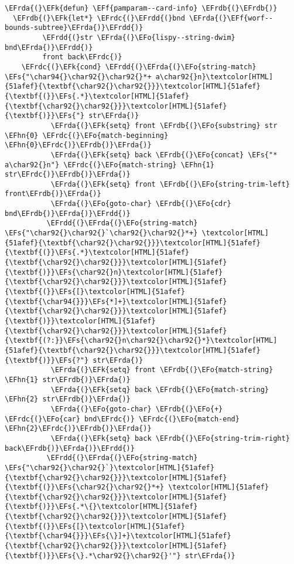 \documentclass[a4wide,10pt]{article}
\newcommand{\EFs}[1]{\textcolor{EFs}{#1}} %
\newcommand{\EFk}[1]{\textcolor{EFk}{#1}} %
\newcommand{\EFf}[1]{\textcolor{EFf}{#1}} %
\newcommand{\EFo}[1]{\textcolor{EFo}{#1}} %
\newcommand{\EFhn}[1]{\textcolor{EFhn}{\textbf{#1}}} %
\newcommand{\EFrda}[1]{\textcolor{EFrda}{#1}} %
\newcommand{\EFrdb}[1]{\textcolor{EFrdb}{#1}} %
\newcommand{\EFrdc}[1]{\textcolor{EFrdc}{#1}} %
\newcommand{\EFrdd}[1]{\textcolor{EFrdd}{#1}} %
\begin{document}
\begin{Code}
\begin{Verbatim}
\EFrda{(}\EFk{defun} \EFf{pamparam--card-info} \EFrdb{(}\EFrdb{)}
  \EFrdb{(}\EFk{let*} \EFrdc{(}\EFrdd{(}bnd \EFrda{(}\EFf{worf--bounds-subtree}\EFrda{)}\EFrdd{)}
         \EFrdd{(}str \EFrda{(}\EFo{lispy--string-dwim} bnd\EFrda{)}\EFrdd{)}
         front back\EFrdc{)}
    \EFrdc{(}\EFk{cond} \EFrdd{(}\EFrda{(}\EFo{string-match} \EFs{"\char94{}\char92{}\char92{}*+ a\char92{}n}\textcolor[HTML]{51afef}{\textbf{\char92{}\char92{}}}\textcolor[HTML]{51afef}{\textbf{(}}\EFs{.*}\textcolor[HTML]{51afef}{\textbf{\char92{}\char92{}}}\textcolor[HTML]{51afef}{\textbf{)}}\EFs{"} str\EFrda{)}
           \EFrda{(}\EFk{setq} front \EFrdb{(}\EFo{substring} str \EFhn{0} \EFrdc{(}\EFo{match-beginning} \EFhn{0}\EFrdc{)}\EFrdb{)}\EFrda{)}
           \EFrda{(}\EFk{setq} back \EFrdb{(}\EFo{concat} \EFs{"* a\char92{}n"} \EFrdc{(}\EFo{match-string} \EFhn{1} str\EFrdc{)}\EFrdb{)}\EFrda{)}
           \EFrda{(}\EFk{setq} front \EFrdb{(}\EFo{string-trim-left} front\EFrdb{)}\EFrda{)}
           \EFrda{(}\EFo{goto-char} \EFrdb{(}\EFo{cdr} bnd\EFrdb{)}\EFrda{)}\EFrdd{)}
          \EFrdd{(}\EFrda{(}\EFo{string-match} \EFs{"\char92{}\char92{}`\char92{}\char92{}*+} \textcolor[HTML]{51afef}{\textbf{\char92{}\char92{}}}\textcolor[HTML]{51afef}{\textbf{(}}\EFs{.*}\textcolor[HTML]{51afef}{\textbf{\char92{}\char92{}}}\textcolor[HTML]{51afef}{\textbf{)}}\EFs{\char92{}n}\textcolor[HTML]{51afef}{\textbf{\char92{}\char92{}}}\textcolor[HTML]{51afef}{\textbf{(}}\EFs{[}\textcolor[HTML]{51afef}{\textbf{\char94{}}}\EFs{*]+}\textcolor[HTML]{51afef}{\textbf{\char92{}\char92{}}}\textcolor[HTML]{51afef}{\textbf{)}}\textcolor[HTML]{51afef}{\textbf{\char92{}\char92{}}}\textcolor[HTML]{51afef}{\textbf{(?:}}\EFs{\char92{}n\char92{}\char92{}*}\textcolor[HTML]{51afef}{\textbf{\char92{}\char92{}}}\textcolor[HTML]{51afef}{\textbf{)}}\EFs{?"} str\EFrda{)}
           \EFrda{(}\EFk{setq} front \EFrdb{(}\EFo{match-string} \EFhn{1} str\EFrdb{)}\EFrda{)}
           \EFrda{(}\EFk{setq} back \EFrdb{(}\EFo{match-string} \EFhn{2} str\EFrdb{)}\EFrda{)}
           \EFrda{(}\EFo{goto-char} \EFrdb{(}\EFo{+} \EFrdc{(}\EFo{car} bnd\EFrdc{)} \EFrdc{(}\EFo{match-end} \EFhn{2}\EFrdc{)}\EFrdb{)}\EFrda{)}
           \EFrda{(}\EFk{setq} back \EFrdb{(}\EFo{string-trim-right} back\EFrdb{)}\EFrda{)}\EFrdd{)}
          \EFrdd{(}\EFrda{(}\EFo{string-match} \EFs{"\char92{}\char92{}`}\textcolor[HTML]{51afef}{\textbf{\char92{}\char92{}}}\textcolor[HTML]{51afef}{\textbf{(}}\EFs{\char92{}\char92{}*+} \textcolor[HTML]{51afef}{\textbf{\char92{}\char92{}}}\textcolor[HTML]{51afef}{\textbf{)}}\EFs{.*\{}\textcolor[HTML]{51afef}{\textbf{\char92{}\char92{}}}\textcolor[HTML]{51afef}{\textbf{(}}\EFs{[}\textcolor[HTML]{51afef}{\textbf{\char94{}}}\EFs{\}]+}\textcolor[HTML]{51afef}{\textbf{\char92{}\char92{}}}\textcolor[HTML]{51afef}{\textbf{)}}\EFs{\}.*\char92{}\char92{}'"} str\EFrda{)}

\end{Verbatim}
\end{Code}
\end{document}
